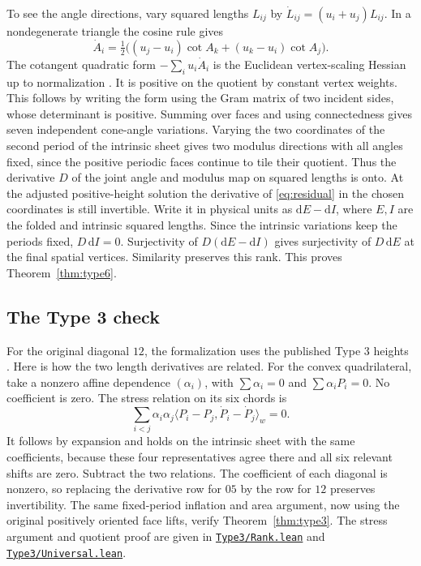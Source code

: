 \documentclass[11pt,letterpaper]{amsart}
\newcommand{\dd}{\mathrm d}
\newcommand{\release}{bd3a0e03908481d738df30233cf95c641a1d3f71}
\newcommand{\src}[2]{\href{https://github.com/vltanh/lean4-origami-torus/blob/\release/#1}{\texttt{#2}}}
\begin{document}
To see the angle directions, vary squared lengths \(L_{ij}\) by
\(\dot L_{ij}=(u_i+u_j)L_{ij}\). In a nondegenerate triangle the
cosine rule gives
\[
 \dot A_i=\tfrac12\bigl((u_j-u_i)\cot A_k+
                         (u_k-u_i)\cot A_j\bigr).
\]
The cotangent quadratic form \(-\sum_i u_i\dot A_i\) is the
Euclidean vertex-scaling Hessian up to normalization
\cite[Propositions~4.1.6 and~4.2.3]{bps}. It is positive on the
quotient by constant vertex weights. This follows by writing the
form using the Gram matrix of two incident sides, whose determinant
is positive.
Summing over faces and using connectedness gives seven
independent cone-angle variations. Varying the two coordinates of
the second period of the intrinsic sheet gives two modulus
directions with all angles fixed, since the positive periodic
faces continue to tile their quotient. Thus the derivative \(D\)
of the joint angle and modulus map on squared lengths is onto.
At the adjusted positive-height solution the derivative of
\eqref{eq:residual} in the chosen coordinates is still invertible.
Write it in physical units as \(\dd E-\dd I\), where \(E,I\)
are the folded and intrinsic squared lengths. Since the intrinsic
variations keep the periods fixed, \(D\,\dd I=0\).
Surjectivity of \(D(\dd E-\dd I)\) gives surjectivity of
\(D\,\dd E\) at the final spatial vertices. Similarity preserves
this rank. This proves Theorem~\ref{thm:type6}.

\subsection*{The Type 3 check}

For the original diagonal \(12\), the formalization uses the
published Type \(3\) heights \cite[\S4]{dlst}. Here is how the two
length derivatives are related. For the convex quadrilateral,
take a nonzero affine dependence \((\alpha_i)\), with
\(\sum\alpha_i=0\) and \(\sum\alpha_iP_i=0\). No coefficient is
zero. The stress relation on its six chords is
\[
 \sum_{i<j}\alpha_i\alpha_j
       \langle P_i-P_j,\dot P_i-\dot P_j\rangle_w=0.
\]
It follows by expansion and holds on the intrinsic sheet with
the same coefficients, because these four representatives agree
there and all six relevant shifts are zero. Subtract the two
relations. The coefficient of each diagonal is nonzero, so
replacing the derivative row for \(05\) by the row for \(12\)
preserves invertibility. The same fixed-period inflation and area
argument, now using the original positively oriented face lifts,
verify Theorem~\ref{thm:type3}. The stress argument and quotient
proof are given in
\src{OrigamiTorus/EightVertex/Type3/Rank.lean}{Type3/Rank.lean} and
\src{OrigamiTorus/EightVertex/Type3/Universal.lean}{Type3/Universal.lean}.
\end{document}
